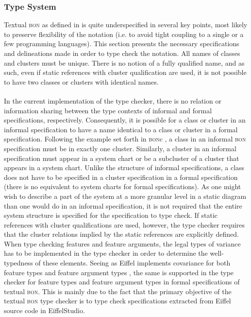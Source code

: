\subsubsection {Type System}
\label{design-type-system}
Textual \textsc{bon} as defined in \cite{walden1995} is quite underspecified in several key points, most likely to preserve flexibility of the notation (i.e. to avoid tight coupling to a single or a few programming languages). This section presents the necessary specifications and delineations made in order to type check the notation.
\label{design-type-names}
All names of classes and clusters must be unique. There is no notion of a fully qualified name, and as such, even if static references with cluster qualification are used, it is not possible to have two classes or clusters with identical names.
\paragraph{} In the current implementation of the type checker, there is no relation or information sharing between the type contexts of informal and formal specifications, respectively. Consequently, it is possible for a class or cluster in an informal specification to have a name identical to a class or cluster in a formal specification.
Following the example set forth in \textsc{bon}c \cite{bonc}, a class in an informal \textsc{bon} specification must be in exactly one cluster. Similarly, a cluster in an informal specification must appear in a system chart or be a subcluster of a cluster that appears in a system chart.
Unlike the structure of informal specifications, a class does not have to be specified in a cluster specification in a formal specification (there is no equivalent to system charts for formal specifications). As one might wish to describe a part of the system at a more granular level in a static diagram than one would do in an informal specification, it is not required that the entire system structure is specified for the specification to type check. If static references with cluster qualifications are used, however, the type checker requires that the cluster relations implied by the static references are explicitly defined.
When type checking features and feature arguments, the legal types of variance has to be implemented in the type checker in order to determine the well-typedness of these elements. Seeing as Eiffel implements covariance for both feature types and feature argument types  \cite[the~Covariance~rule]{meyer2001}, the same is supported in the type checker for feature types and feature argument types in formal specifications of textual \textsc{bon}. This is mainly due to the fact that the primary objective of the textual \textsc{bon} type checker is to type check specifications extracted from Eiffel source code in EiffelStudio.
